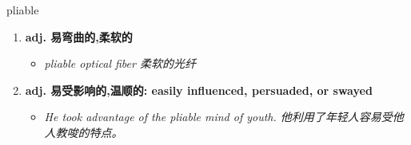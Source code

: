 
\begin{frame}
{\huge pliable}
\begin{center}
\begin{enumerate}\Large
  \item \textbf{adj. 易弯曲的,柔软的}
  \begin{itemize}
    \item \em{\Large{pliable optical fiber 柔软的光纤}}
  \end{itemize}
  \item \textbf{adj. 易受影响的,温顺的: easily influenced, persuaded, or swayed}
  \begin{itemize}
    \item \em{\Large{He took advantage of the pliable mind of youth. 他利用了年轻人容易受他人教唆的特点。}}
  \end{itemize}
\end{enumerate}
\end{center}
\end{frame}
